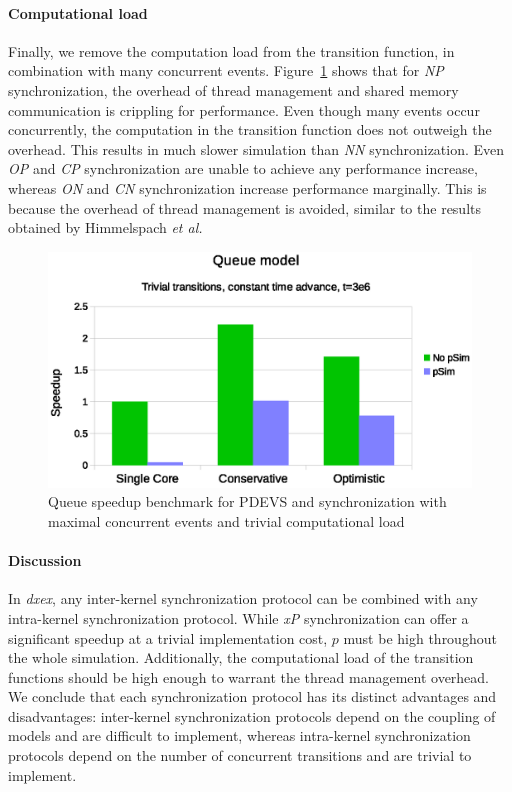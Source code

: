 \paragraph{Computational load}
Finally, we remove the computation load from the transition function, in combination with many concurrent events.
Figure~\ref{fig:psim_plot_no_sleep} shows that for \textit{NP} synchronization, the overhead of thread management and shared memory communication is crippling for performance.
Even though many events occur concurrently, the computation in the transition function does not outweigh the overhead.
This results in much slower simulation than \textit{NN} synchronization.
Even \textit{OP} and \textit{CP} synchronization are unable to achieve any performance increase, whereas \textit{ON} and \textit{CN} synchronization increase performance marginally.
This is because the overhead of thread management is avoided, similar to the results obtained by Himmelspach \textit{et al.}~\cite{Himmelspach}
 
\begin{figure}
	\center
	\includegraphics[width=\columnwidth]{fig/pdevs_no_sleep.eps}
	\caption{Queue speedup benchmark for PDEVS and synchronization with maximal concurrent events and trivial computational load}
	\label{fig:psim_plot_no_sleep}
\end{figure}

\paragraph{Discussion}
In \textit{dxex}, any inter-kernel synchronization protocol can be combined with any intra-kernel synchronization protocol.
While \textit{xP} synchronization can offer a significant speedup at a trivial implementation cost, $p$ must be high throughout the whole simulation.
Additionally, the computational load of the transition functions should be high enough to warrant the thread management overhead.
We conclude that each synchronization protocol has its distinct advantages and disadvantages:
inter-kernel synchronization protocols depend on the coupling of models and are difficult to implement, whereas intra-kernel synchronization protocols depend on the number of concurrent transitions and are trivial to implement.

